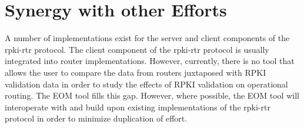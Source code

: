 %
%
%



\section{Synergy with other Efforts}

A number of implementations exist for the server and client
components of the rpki-rtr protocol. The client component of the
rpki-rtr protocol is usually integrated into router implementations.
However, currently, there is no tool that allows the user to compare the
data from routers juxtaposed with RPKI validation data in order to study
the effects of RPKI validation on operational routing. The EOM tool
fills this gap. However, where possible, the EOM tool will interoperate
with and build upon existing implementations of the rpki-rtr protocol
in order to minimize duplication of effort.

